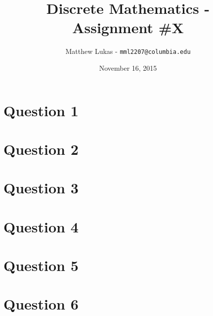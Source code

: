 \documentclass[11pt, oneside]{article}   	%
\title{Discrete Mathematics - Assignment \#X}
\author{Matthew Lukas - \texttt{mml2207@columbia.edu}}
\date{November 16, 2015}							%
\begin{document}
\maketitle

\section*{Question 1}

	

\section*{Question 2}

	

\section*{Question 3}

	

\section*{Question 4}

	

\section*{Question 5}

	

\section*{Question 6}

	
\end{document}
